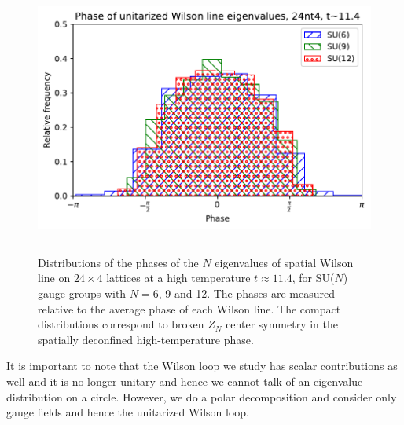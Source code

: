 \begin{figure}[tbp]
  \centering
  \includegraphics[height=9cm]{Figures/WLeig-highT.pdf}
  \caption{\label{fig:WLeig-highT}Distributions of the phases of the $N$ eigenvalues of spatial Wilson line on $24\times 4$ lattices at a high temperature $t \approx 11.4$, for SU($N$) gauge groups with $N = 6$, 9 and 12.  The phases are measured relative to the average phase of each Wilson line.  The compact distributions correspond to broken $Z_N$ center symmetry in the spatially deconfined high-temperature phase.}
\end{figure}

It is important to note that the Wilson loop we study has scalar contributions as well and it is no longer unitary and 
hence we cannot talk of an eigenvalue distribution on a circle.
However, we do a polar decomposition and consider only gauge fields and hence the unitarized Wilson loop. 


